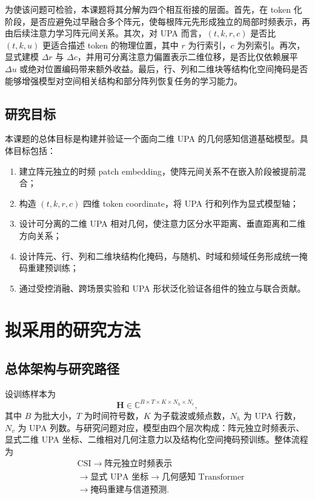 \documentclass[journal]{IEEEtran}
\begin{document}
为使该问题可检验，本课题将其分解为四个相互衔接的层面。首先，在 token 化阶段，是否应避免过早融合多个阵元，使每根阵元先形成独立的局部时频表示，再由后续注意力学习阵元间关系。其次，对 UPA 而言，\((t,k,r,c)\) 是否比 \((t,k,u)\) 更适合描述 token 的物理位置，其中 \(r\) 为行索引，\(c\) 为列索引。再次，显式建模 \(\Delta r\) 与 \(\Delta c\)，并用可分离注意力偏置表示二维位移，是否比仅依赖展平 \(\Delta u\) 或绝对位置编码带来额外收益。最后，行、列和二维块等结构化空间掩码是否能够增强模型对空间相关结构和部分阵列恢复任务的学习能力。

\subsection{研究目标}

本课题的总体目标是构建并验证一个面向二维 UPA 的几何感知信道基础模型。具体目标包括：
\begin{enumerate}
\item 建立阵元独立的时频 patch embedding，使阵元间关系不在嵌入阶段被提前混合；
\item 构造 \((t,k,r,c)\) 四维 token coordinate，将 UPA 行和列作为显式模型轴；
\item 设计可分离的二维 UPA 相对几何，使注意力区分水平距离、垂直距离和二维方向关系；
\item 设计阵元、行、列和二维块结构化掩码，与随机、时域和频域任务形成统一掩码重建预训练；
\item 通过受控消融、跨场景实验和 UPA 形状泛化验证各组件的独立与联合贡献。
\end{enumerate}

\section{拟采用的研究方法}

\subsection{总体架构与研究路径}

设训练样本为
\begin{equation}
\mathbf{H}\in\mathbb{C}^{B\times T\times K\times N_h\times N_v},
\end{equation}
其中 \(B\) 为批大小，\(T\) 为时间符号数，\(K\) 为子载波或频点数，\(N_h\) 为 UPA 行数，\(N_v\) 为 UPA 列数。与研究问题对应，模型由四个层次构成：阵元独立时频表示、显式二维 UPA 坐标、二维相对几何注意力以及结构化空间掩码预训练。整体流程为
\[
\begin{aligned}
&\mathrm{CSI}\rightarrow \text{阵元独立时频表示}\\
&\rightarrow \text{显式 UPA 坐标}\rightarrow \text{几何感知 Transformer}\\
&\rightarrow \text{掩码重建与信道预测}.
\end{aligned}
\]
\end{document}

